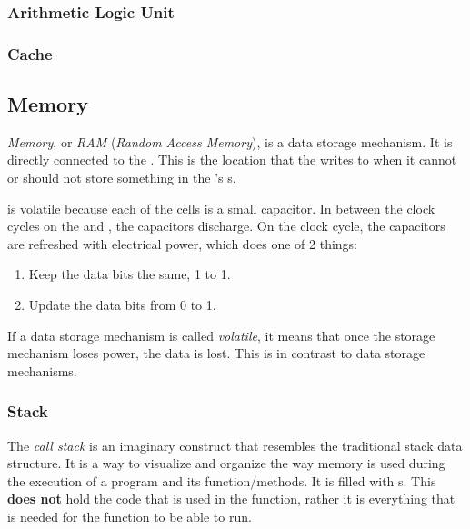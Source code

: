 \subsubsection{Arithmetic Logic Unit}\label{subsubsec:ALU}
\subsubsection{Cache}\label{subsubsec:CPU_Cache}

\subsection{Memory}\label{subsec:Memory}
\begin{definition}[Memory]\label{def:Memory}
  \emph{Memory}, or \emph{RAM} (\emph{Random Access Memory}), is a  data storage mechanism.
  It is directly connected to the .
  This is the location that the  writes to when it cannot or should not store something in the 's s.

  \begin{remark}[Volatility]
     is volatile because each of the cells is a small capacitor.
    In between the clock cycles on the  and , the capacitors discharge.
    On the clock cycle, the capacitors are refreshed with electrical power, which does one of 2 things:
    \begin{enumerate}[noitemsep]
    \item Keep the data bits the same, 1 to 1.
    \item Update the data bits from 0 to 1.
    \end{enumerate}
  \end{remark}
\end{definition}

\begin{definition}[Volatile]\label{def:Volatile}
  If a data storage mechanism is called \emph{volatile}, it means that once the storage mechanism loses power, the data is lost.
  This is in contrast to  data storage mechanisms.
\end{definition}

\subsubsection{Stack}\label{subsubsec:Memory_Stack}
\begin{definition}\label{def:Call_Stack}
  The \emph{call stack} is an imaginary construct that resembles the traditional stack data structure.
  It is a way to visualize and organize the way memory is used during the execution of a program and its function/methods.
  It is filled with s.
  This \textbf{does not} hold the code that is used in the function, rather it is everything that is needed for the function to be able to run.
\end{definition}

